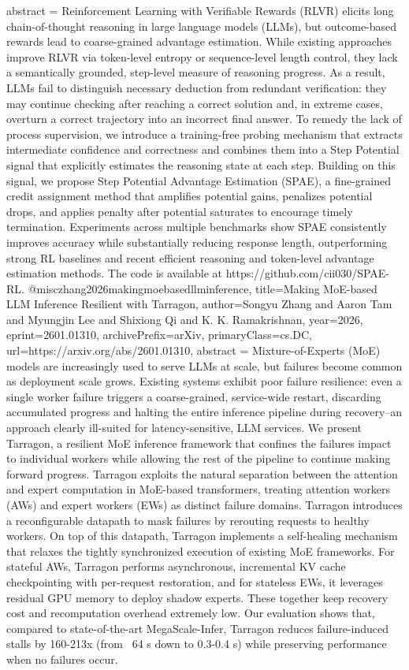 {      abstract = {Reinforcement Learning with Verifiable Rewards (RLVR) elicits long chain-of-thought reasoning in large language models (LLMs), but outcome-based rewards lead to coarse-grained advantage estimation. While existing approaches improve RLVR via token-level entropy or sequence-level length control, they lack a semantically grounded, step-level measure of reasoning progress. As a result, LLMs fail to distinguish necessary deduction from redundant verification: they may continue checking after reaching a correct solution and, in extreme cases, overturn a correct trajectory into an incorrect final answer. To remedy the lack of process supervision, we introduce a training-free probing mechanism that extracts intermediate confidence and correctness and combines them into a Step Potential signal that explicitly estimates the reasoning state at each step. Building on this signal, we propose Step Potential Advantage Estimation (SPAE), a fine-grained credit assignment method that amplifies potential gains, penalizes potential drops, and applies penalty after potential saturates to encourage timely termination. Experiments across multiple benchmarks show SPAE consistently improves accuracy while substantially reducing response length, outperforming strong RL baselines and recent efficient reasoning and token-level advantage estimation methods. The code is available at https://github.com/cii030/SPAE-RL.}
}@misc{zhang2026makingmoebasedllminference,
      title={Making MoE-based LLM Inference Resilient with Tarragon}, 
      author={Songyu Zhang and Aaron Tam and Myungjin Lee and Shixiong Qi and K. K. Ramakrishnan},
      year={2026},
      eprint={2601.01310},
      archivePrefix={arXiv},
      primaryClass={cs.DC},
      url={https://arxiv.org/abs/2601.01310},
      abstract = {Mixture-of-Experts (MoE) models are increasingly used to serve LLMs at scale, but failures become common as deployment scale grows. Existing systems exhibit poor failure resilience: even a single worker failure triggers a coarse-grained, service-wide restart, discarding accumulated progress and halting the entire inference pipeline during recovery--an approach clearly ill-suited for latency-sensitive, LLM services.   We present Tarragon, a resilient MoE inference framework that confines the failures impact to individual workers while allowing the rest of the pipeline to continue making forward progress. Tarragon exploits the natural separation between the attention and expert computation in MoE-based transformers, treating attention workers (AWs) and expert workers (EWs) as distinct failure domains. Tarragon introduces a reconfigurable datapath to mask failures by rerouting requests to healthy workers. On top of this datapath, Tarragon implements a self-healing mechanism that relaxes the tightly synchronized execution of existing MoE frameworks. For stateful AWs, Tarragon performs asynchronous, incremental KV cache checkpointing with per-request restoration, and for stateless EWs, it leverages residual GPU memory to deploy shadow experts. These together keep recovery cost and recomputation overhead extremely low. Our evaluation shows that, compared to state-of-the-art MegaScale-Infer, Tarragon reduces failure-induced stalls by 160-213x (from ~64 s down to 0.3-0.4 s) while preserving performance when no failures occur.}
}
